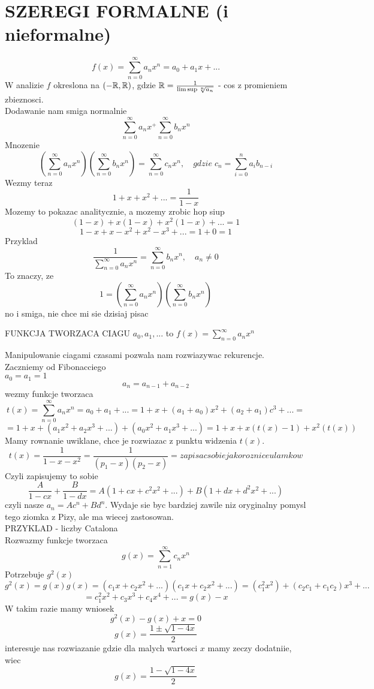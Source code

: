 \documentclass{article}
\begin{document}
\ttfamily
\section*{SZEREGI FORMALNE (i nieformalne)}
$$f(x)=\sum\limits_{n=0}^\infty a_nx^n=a_0+a_1x+...$$
W analizie $f$ okreslona na $(-\mathbb{R}, \mathbb{R})$, gdzie $\mathbb{R}=\frac{1}{\lim\sup \sqrt[n]{a_n}}$ - cos z promieniem zbieznosci.\medskip\\
Dodawanie nam smiga normalnie
$$\sum\limits_{n=0}^\infty a_nx^+\sum\limits_{n=0}^\infty b_nx^n$$
Mnozenie
$$(\sum\limits_{n=0}^\infty a_nx^n)(\sum\limits_{n=0}^\infty b_nx^n)=\sum\limits_{n=0}^\infty c_nx^n,\quad gdzie\; c_n=\sum\limits_{i=0}^n a_ib_{n-i}$$
Wezmy teraz
$$1+x+x^2+...=\frac1{1-x}$$
Mozemy to pokazac analitycznie, a mozemy zrobic hop siup
$$(1-x)+x(1-x)+x^2(1-x)+...=1$$
$$1-x+x-x^2+x^2-x^3+...=1+0=1$$
Przyklad\medskip\\
$$\frac1{\sum\limits_{n=0}^\infty a_nx^n}= \sum\limits_{n=0}^\infty b_nx^n,\quad a_n\neq0$$
To znaczy, ze
$$1=(\sum\limits_{n=0}^\infty a_nx^n)(\sum\limits_{n=0}^\infty b_nx^n)$$
no i smiga, nie chce mi sie dzisiaj pisac\medskip\\
\begin{center}\large
{\color{def} FUNKCJA TWORZACA CIAGU} $a_0, a_1, ...$ to $f(x)=\sum\limits_{n=0}^\infty a_nx^n$
\end{center}
Manipulowanie ciagami czasami pozwala nam rozwiazywac rekurencje.\medskip\\
Zaczniemy od Fibonacciego\bigskip\\
$a_0=a_1=1$
$$a_n=a_{n-1}+a_{n-2}$$
wezmy funkcje tworzaca
$$t(x)=\sum\limits_{n=0}^\infty a_nx^n=a_0+a_1+...=1+x+(a_1+a_0)x^2+(a_2+a_1)c^3+...=$$
$$=1+x+(a_1x^2+a_2x^3+...)+(a_0x^2+a_1x^3+...)=1+x+x(t(x)-1)+x^2(t(x))$$
Mamy rownanie uwiklane, chce je rozwiazac z punktu widzenia $t(x)$.\medskip\\
$$t(x)=\frac1{1-x-x^2}=\frac1{(p_1-x)(p_2-x)}= zapisac sobie jako roznice ulamkow$$
Czyli zapisujemy to sobie
$$\frac A {1-cx}+\frac B{1- dx}=A(1+cx+c^2x^2+...)+B(1+dx+d^2x^2+...)$$
czyli nasze $a_n=Ac^n+Bd^n$. Wydaje sie byc bardziej zawile niz oryginalny pomysl tego ziomka z Pizy, ale ma wiecej zastosowan.\bigskip\\
PRZYKLAD - liczby Catalona\\
Rozwazmy funkcje tworzaca
$$g(x)=\sum\limits_{n=1}^\infty c_n x^n$$
Potrzebuje $g^2(x)$
$$g^2(x)=g(x)g(x)=(c_1x+c_2x^2+...)(c_1x+c_2x^2+...)=(c_1^2x^2)+(c_2c_1+c_1c_2)x^3+...$$
$$=c_1^2x^2+c_3x^3+c_4x^4+...=g(x)-x$$
W takim razie mamy wniosek
$$g^2(x)-g(x)+x=0$$
$$g(x)=\frac{1\pm\sqrt{1-4x}}2$$
interesuje nas rozwiazanie gdzie dla malych wartosci $x$ mamy zeczy dodatniie, wiec
$$g(x)=\frac{1-\sqrt{1-4x}}2$$
\end{document}
